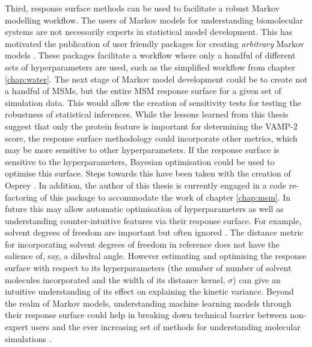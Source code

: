 Third, response surface methods can be used to facilitate a robust Markov modelling workflow. The users of Markov models for understanding biomolecular systems are not necessarily experts in statistical model development. This has motivated the publication of user friendly packages for creating \emph{arbitrary} Markov models \cite{schererPyEMMASoftwarePackage2015a,beauchampMSMBuilder2ModelingConformational2011}. These packages facilitate a workflow where only a handful of different sets of hyperparameters are used, such as the simplified workflow from chapter \ref{chap:water}. The next stage of Markov model development could be to create not a handful of MSMs, but the entire MSM response surface for a given set of simulation data. This would allow the creation of sensitivity tests for testing the robustness of statistical inferences.  While the lessons learned from this thesis suggest that only the protein feature is important for determining the VAMP-2 score, the response surface methodology could incorporate other metrics, which may be more sensitive to other hyperparameters. If the response surface is sensitive to the hyperparameters, Bayesian optimisation could be used to optimise this surface.  Steps towards this have been taken with the creation of Osprey \cite{mcgibbonOspreyHyperparameterOptimization2016}.  In addition, the author of this thesis is currently engaged in a code re-factoring of this package to accommodate the work of chapter \ref{chap:msm}. In future this may allow automatic optimisation of hyperparameters as well as understanding counter-intuitive features via their response surface. For example, solvent degrees of freedom are important but often ignored \cite{guBuildingMarkovState2013}. The distance metric for incorporating solvent degrees of freedom in reference \cite{guBuildingMarkovState2013} does not have the salience of, say, a dihedral angle. However estimating and optimising the response surface with respect to its hyperparameters (the number of number of solvent molecules incorporated and the width of its distance kernel, $\sigma$) can give an intuitive understanding of its effect on explaining the kinetic variance. Beyond the realm of Markov models, understanding machine learning models through their response surface could help in breaking down technical barrier between non-expert users and the ever increasing set of methods for understanding molecular simulations \cite{noeMachineLearningMolecular2020}.




